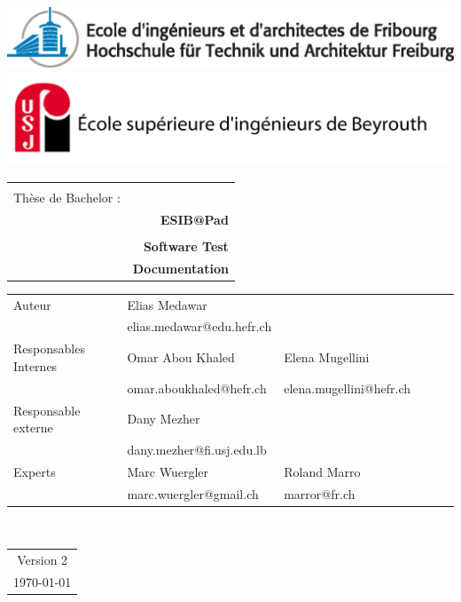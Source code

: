 \begin{titlepage}
\setlength\topmargin{0in}
\setlength\headheight{-0.3in}
\begin{center}

\includegraphics[width=1\textwidth]{../comon/logos/EIA_couleur.eps}  \\

\includegraphics[width=1\textwidth]{../comon/logos/esib_nom.jpg}  \\[0.5cm] 
\end{center}

\begin{tabular}{p{9cm} r}
\hline \\[1cm]
{ \huge {Thèse de Bachelor : } } &  \\
&  \huge \bfseries  ESIB@Pad  \\[1cm]
\hline \\[0.3cm]
 & \Large \bfseries Software  Test \\
 & \Large \bfseries Documentation \\[1cm]
\end{tabular}

\begin{tabular}{l l l l l l}
Auteur & Elias Medawar & \\[0.1cm]
& elias.medawar@edu.hefr.ch & \\[0.5cm]
Responsables Internes  & Omar Abou Khaled & Elena Mugellini  \\[0.1cm]
&omar.aboukhaled@hefr.ch  & elena.mugellini@hefr.ch \\[0.5cm]	
Responsable externe & Dany Mezher & \\[0.1cm]
&dany.mezher@fi.usj.edu.lb   & \\[0.5cm]
Experts & Marc Wuergler  & Roland Marro   \\[.1cm]
&marc.wuergler@gmail.ch & marror@fr.ch \\[1.5cm]	
\end{tabular}
\\
\begin{center}
\begin{tabular}{c}
Version  2 \\[0.5cm]
 {\today} \\[0.5cm]
\end{tabular}
 \end{center}
\end{titlepage}

